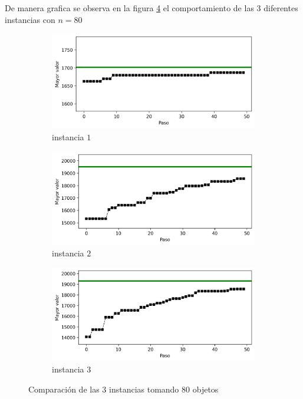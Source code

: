 \documentclass{article}
\begin{document}
De manera grafica se observa en la figura \ref{f2} el comportamiento de las 3 diferentes instancias con $n=80$ 

\begin{figure}[H]
       \centering
       \begin{subfigure}[b]{0.8\linewidth}
           \includegraphics[width=\linewidth]{80i1.png}
           \caption{instancia $1$}
           \label{fig:westminster_lateral}
        \end{subfigure}
        \begin{subfigure}[b]{0.8\linewidth}
            \includegraphics[width=\linewidth]{8012.png}
            \caption{instancia $2$}
            \label{fig:westminster_aerea}
        \end{subfigure}
        \begin{subfigure}[b]{0.8\linewidth}
           \includegraphics[width=\linewidth]{80i3.png}
           \caption{instancia $3$}
           \label{fig:westminster_aerea}
        \end{subfigure}
        \caption{Comparaci\'on de las $3$ instancias tomando $80$ objetos}
        \label{f2}
\end{figure}
\end{document}
